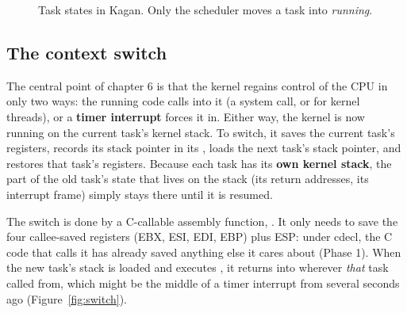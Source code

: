 \documentclass[11pt,a4paper]{article}
\begin{document}
\begin{figure}[htbp]
\centering
{}
\caption{Task states in Kagan. Only the scheduler moves a task into \emph{running}.}
\label{fig:states}
\end{figure}

\subsection{The context switch}

The central point of \OSTEP chapter 6 is that the kernel regains control of the CPU in only two ways: the running code
calls into it (a system call, or  for kernel threads), or a \textbf{timer interrupt} forces it in. Either
way, the kernel is now running on the current task's kernel stack. To switch, it saves the current task's registers,
records its stack pointer in its , loads the next task's stack pointer, and restores that task's
registers. Because each task has its \textbf{own kernel stack}, the part of the old task's state that lives on the
stack (its return addresses, its interrupt frame) simply stays there until it is resumed.

The switch is done by a C-callable assembly function, . It only needs to save the four
callee-saved registers (EBX, ESI, EDI, EBP) plus ESP: under cdecl, the C code that calls it has already saved anything
else it cares about (Phase 1). When the new task's stack is loaded and  executes , it
returns into wherever \emph{that} task called  from, which might be the middle of a timer
interrupt from several seconds ago (Figure~\ref{fig:switch}).
\end{document}
